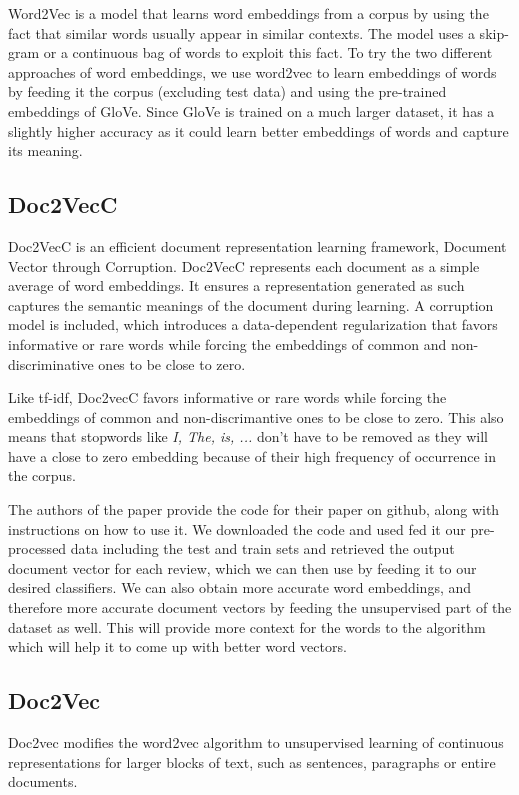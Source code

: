 \documentclass{article}
\begin{document}
	Word2Vec is a model that learns word embeddings from a corpus by using the fact that similar words usually appear in similar contexts. The model uses a skip-gram or a continuous bag of words to exploit this fact. To try the two different approaches of word embeddings, we use word2vec to learn embeddings of words by feeding it the corpus (excluding test data) and using the pre-trained embeddings of GloVe. Since GloVe is trained on a much larger dataset, it has a slightly higher accuracy as it could learn better embeddings of words and capture its meaning.
	
	\subsection{Doc2VecC}
	
	Doc2VecC is an efficient document representation learning framework, Document Vector through Corruption. Doc2VecC represents each document as a simple average of word embeddings. It ensures a representation generated as such captures the semantic meanings of the document during learning. A corruption model is included, which introduces a data-dependent regularization that favors informative or rare words while forcing the embeddings of common and non-discriminative ones to be close to zero. \cite{chen2017efficient}
	
	Like tf-idf, Doc2vecC favors informative or rare words while forcing the embeddings of common and non-discrimantive ones to be close to zero. This also means that stopwords like \textit{I, The, is, ...} don't have to be removed as they will have a close to zero embedding because of their high frequency of occurrence in the corpus.
	
	The authors of the paper provide the code for their paper on github, along with instructions on how to use it. We downloaded the code and used fed it our pre-processed data including the test and train sets and retrieved the output document vector for each review, which we can then use by feeding it to our desired classifiers. We can also obtain more accurate word embeddings, and therefore more accurate document vectors by feeding the unsupervised part of the dataset as well. This will provide more context for the words to the algorithm which will help it to come up with better word vectors.
	
	\subsection{Doc2Vec}
	Doc2vec modifies the word2vec algorithm to unsupervised learning of continuous representations for larger blocks of text, such as sentences, paragraphs or entire documents.
	
\end{document}
